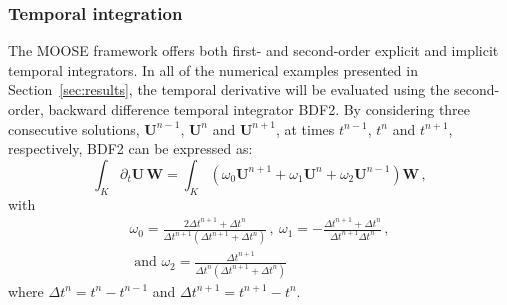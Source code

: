 \documentclass[preprint,10pt]{elsarticle}
\newcommand{\sct}[1]{Section~\ref{#1}}                   %
\begin{document}
\subsubsection{Temporal integration} 
The MOOSE framework offers both first- and second-order explicit and implicit temporal integrators. 
In all of the numerical examples presented in \sct{sec:results}, the temporal derivative  will be 
evaluated using the second-order, backward difference temporal integrator BDF2. By considering three 
consecutive solutions, $\mathbf U^{n-1}$, $\mathbf U^n$ and $\mathbf U^{n+1}$, at times $t^{n-1}$, $t^n$ and $t^{n+1}$, respectively, BDF2 can be expressed as:
\begin{equation}
\label{eq:BDF2}
\int_{K} \partial_t \mathbf U \, \mathbf  W = \int_{K} \left( \omega_0 \mathbf U^{n+1}  + \omega_1 \mathbf U^n + \omega_2 \mathbf U^{n-1} \right) \mathbf W \,,
\end{equation}
%
with
\begin{multline}
\omega_0 =\frac{2\Delta t^{n+1}+\Delta t^n}{\Delta t^{n+1} \left( \Delta t^{n+1}+\Delta t^n \right)} \, , \ 
\omega_1 = -\frac{\Delta t^{n+1}+\Delta t^n}{\Delta t^{n+1} \Delta t^n}  \, , \\
\text{ and } \omega_2 = \frac{\Delta t^{n+1}}{\Delta t^n \left( \Delta t^{n+1} + \Delta t^n \right)} \nonumber
\end{multline}
where $\Delta t^{n} = t^n-t^{n-1}$ and $\Delta t^{n+1} = t^{n+1}-t^{n}$.
\end{document}
